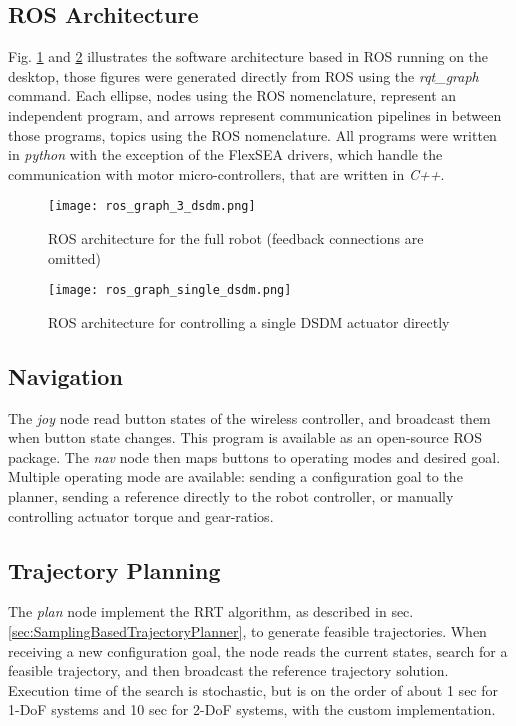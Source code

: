 \subsection{ROS Architecture}

Fig. \ref{fig:ros_3dsdm} and \ref{fig:ros_dsdm} illustrates the software architecture based in ROS running on the desktop, those figures were generated directly from ROS using the \textit{rqt\_graph} command. Each ellipse, nodes using the ROS nomenclature, represent an independent program, and arrows represent communication pipelines in between those programs, topics using the ROS nomenclature. All programs were written in \textit{python} with the exception of the FlexSEA drivers, which handle the communication with motor micro-controllers, that are written in \textit{C++}.

\begin{figure}[htpb]
	\centering
		\texttt{[image: ros\_graph\_3\_dsdm.png]}
	\caption{ROS architecture for the full robot (feedback connections are omitted)}
	\label{fig:ros_3dsdm}
\end{figure}

\begin{figure}[htpb]
	\centering
		\texttt{[image: ros\_graph\_single\_dsdm.png]}
	\caption{ROS architecture for controlling a single DSDM actuator directly}
	\label{fig:ros_dsdm}
\end{figure}


\subsection{Navigation}

The \textit{joy} node read button states of the wireless controller, and broadcast them when button state changes. This program is available as an open-source ROS package. The \textit{nav} node then maps buttons to operating modes and desired goal. Multiple operating mode are available: sending a configuration goal to the planner, sending a reference directly to the robot controller, or manually controlling actuator torque and gear-ratios. 

\subsection{Trajectory Planning}

The \textit{plan} node implement the RRT algorithm, as described in sec. \ref{sec:SamplingBasedTrajectoryPlanner}, to generate feasible trajectories. When receiving a new configuration goal, the node reads the current states, search for a feasible trajectory, and then broadcast the reference trajectory solution. Execution time of the search is stochastic, but is on the order of about 1 sec for 1-DoF systems and 10 sec for 2-DoF systems, with the custom implementation.

